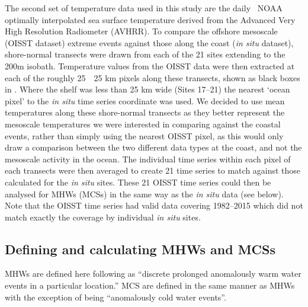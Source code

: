 \documentclass[a4paper,10pt,review]{elsarticle}
\begin{document}
The second set of temperature data used in this study are the daily \degree~NOAA optimally interpolated sea surface temperature \citep[OISST;][]{Reynolds2007} derived from the Advanced Very High Resolution Radiometer (AVHRR). To compare the offshore mesoscale (OISST dataset) extreme events against those along the coast (\emph{in situ} dataset), shore-normal transects were drawn from each of the 21 sites extending to the 200m isobath. Temperature values from the OISST data were then extracted at each of the roughly 25~\texttimes~25 km pixels along these transects, shown as black boxes in . Where the shelf was less than 25 km wide (Sites 17--21) the nearest `ocean pixel' to the \emph{in situ} time series coordinate was used. We decided to use mean temperatures along these shore-normal transects as they better represent the mesoscale temperatures we were interested in comparing against the coastal events, rather than simply using the nearest OISST pixel, as this would only draw a comparison between the two different data types at the coast, and not the mesoscale activity in the ocean. The individual time series within each pixel of each transects were then averaged to create 21 time series to match against those calculated for the \emph{in situ} sites. These 21 OISST time series could then be analysed for MHWs (MCSs) in the same way as the \emph{in situ} data (see below). Note that the OISST time series had valid data covering 1982--2015 which did not match exactly the coverage by individual \emph{in situ} sites.

\subsection{Defining and calculating MHWs and MCSs}
MHWs are defined here following \citet{Hobday2016} as ``discrete prolonged anomalously warm water events in a particular location.'' MCS are defined in the same manner as MHWs with the exception of being ``anomalously cold water events''.
\end{document}
